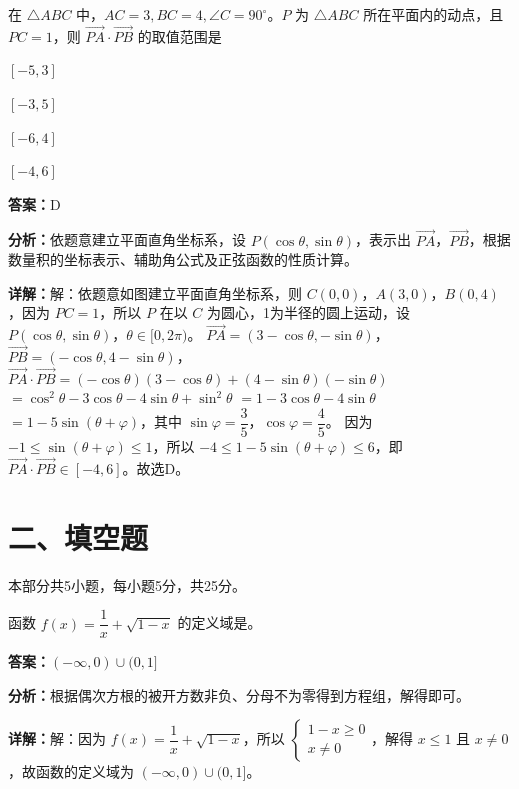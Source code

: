 \begin{question}[points=4]
在 $\triangle ABC$ 中，$AC = 3, BC = 4, \angle C = 90^\circ$。$P$ 为 $\triangle ABC$ 所在平面内的动点，且 $PC = 1$，则 $\overrightarrow{PA} \cdot \overrightarrow{PB}$ 的取值范围是
\begin{choices}
  \item $[-5,3]$
  \item $[-3,5]$
  \item $[-6,4]$
  \item $[-4,6]$
\end{choices}
\begin{solution}
\textbf{答案：}D

\textbf{分析：}依题意建立平面直角坐标系，设 $P(\cos\theta,\sin\theta)$，表示出 $\overrightarrow{PA}$，$\overrightarrow{PB}$，根据数量积的坐标表示、辅助角公式及正弦函数的性质计算。

\textbf{详解：}解：依题意如图建立平面直角坐标系，则 $C(0,0)$，$A(3,0)$，$B(0,4)$，因为 $PC=1$，所以 $P$ 在以 $C$ 为圆心，1为半径的圆上运动，设 $P(\cos\theta,\sin\theta)$，$\theta \in [0,2\pi)$。
$\overrightarrow{PA} = (3-\cos\theta, -\sin\theta)$，$\overrightarrow{PB} = (-\cos\theta, 4-\sin\theta)$，
$\overrightarrow{PA} \cdot \overrightarrow{PB} = (-\cos\theta)(3-\cos\theta) + (4-\sin\theta)(-\sin\theta)$
$= \cos^2\theta - 3\cos\theta - 4\sin\theta + \sin^2\theta$
$= 1 - 3\cos\theta - 4\sin\theta$
$= 1 - 5\sin(\theta + \varphi)$，其中 $\sin\varphi = \dfrac{3}{5}$，$\cos\varphi = \dfrac{4}{5}$。
因为 $-1 \leq \sin(\theta + \varphi) \leq 1$，所以 $-4 \leq 1 - 5\sin(\theta + \varphi) \leq 6$，即 $\overrightarrow{PA} \cdot \overrightarrow{PB} \in [-4,6]$。故选D。
\end{solution}
\end{question}

\section*{二、填空题}
本部分共5小题，每小题5分，共25分。

\begin{question}[points=5]
函数 $f(x) = \dfrac{1}{x} + \sqrt{1-x}$ 的定义域是。
\fillin[{$(-\infty,0) \cup (0,1]$}]
\begin{solution}
\textbf{答案：}$(-\infty,0) \cup (0,1]$

\textbf{分析：}根据偶次方根的被开方数非负、分母不为零得到方程组，解得即可。

\textbf{详解：}解：因为 $f(x) = \dfrac{1}{x} + \sqrt{1-x}$，所以 $\begin{cases} 1-x \geq 0 \\ x \neq 0 \end{cases}$，解得 $x \leq 1$ 且 $x \neq 0$，故函数的定义域为 $(-\infty,0) \cup (0,1]$。
\end{solution}
\end{question}

